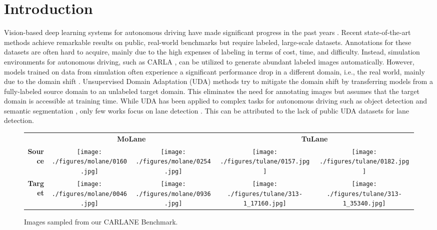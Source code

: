 \documentclass{article}
\begin{document}
	\section{Introduction}
	Vision-based deep learning systems for autonomous driving have made significant progress in the past years \cite{Munir2021, qin2020ultra, pan2018SCNN, Garnett2019, SimuLanes2022}. Recent state-of-the-art methods achieve remarkable results on public, real-world benchmarks but require labeled, large-scale datasets. Annotations for these datasets are often hard to acquire, mainly due to the high expenses of labeling in terms of cost, time, and difficulty.
	Instead, simulation environments for autonomous driving, such as CARLA \cite{Carla2017}, can be utilized to generate abundant labeled images automatically. 
	However, models trained on data from simulation often experience a significant performance drop in a different domain, i.e., the real world, mainly due to the domain shift \cite{saenko2010adapting}. Unsupervised Domain Adaptation (UDA) methods \cite{ganin2015unsupervised, wilson2020survey, Long2015DAN, ZhuDSAN2020, Ganin2016, Tzeng2017ADDA, Xu2019, Sun2019SSL} try to mitigate the domain shift by transferring models from a fully-labeled source domain to an unlabeled target domain. 
	This eliminates the need for annotating images but assumes that the target domain is accessible at training time. 
	While UDA has been applied to complex tasks for autonomous driving such as object detection \cite{Munir2021, Xu2021} and semantic segmentation \cite{WU_2021_CVPR, Zhao2019SemSeg}, only few works focus on lane detection \cite{Garnett2020, SimuLanes2022}. This can be attributed to the lack of public UDA datasets for lane detection.
	
	\begin{figure}[t]
		\centering
		\small
		\begin{tabular}{rc@{}c@{\hskip 0.2cm}c@{}c}
~ & \multicolumn{2}{c}{\textbf{MoLane}} & \multicolumn{2}{c}{\textbf{TuLane}} \\
\textbf{Source} & 
			\texttt{[image: ./figures/molane/0160.jpg]} & 
			\texttt{[image: ./figures/molane/0254.jpg]} &
			\texttt{[image: ./figures/tulane/0157.jpg]} & 
			\texttt{[image: ./figures/tulane/0182.jpg]}\\
\textbf{Target} & 
			\texttt{[image: ./figures/molane/0046.jpg]} & 
			\texttt{[image: ./figures/molane/0936.jpg]} &
			\texttt{[image: ./figures/tulane/313-1\_17160.jpg]} & 
			\texttt{[image: ./figures/tulane/313-1\_35340.jpg]}\\
		\end{tabular}
		\caption{Images sampled from our CARLANE Benchmark.}
		\label{fig:intro}
	\end{figure}
	
\end{document}
